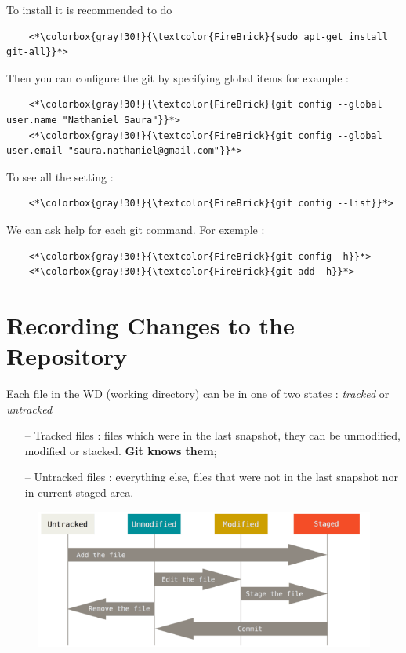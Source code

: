 \documentclass[a4paper,12pt]{article}
\numberwithin{equation}{section} %
\begin{document}
To install it is recommended to do 
\begin{lstlisting}
	<*\colorbox{gray!30!}{\textcolor{FireBrick}{sudo apt-get install git-all}}*> 
\end{lstlisting}
Then you can configure the git by specifying global items for example :
\begin{lstlisting}
	<*\colorbox{gray!30!}{\textcolor{FireBrick}{git config --global user.name "Nathaniel Saura"}}*>
	<*\colorbox{gray!30!}{\textcolor{FireBrick}{git config --global user.email "saura.nathaniel@gmail.com"}}*>
\end{lstlisting}
To see all the setting :
\begin{lstlisting}
	<*\colorbox{gray!30!}{\textcolor{FireBrick}{git config --list}}*>
\end{lstlisting}

We can ask help for each git command. For exemple :
\begin{lstlisting}
	<*\colorbox{gray!30!}{\textcolor{FireBrick}{git config -h}}*>
	<*\colorbox{gray!30!}{\textcolor{FireBrick}{git add -h}}*>
\end{lstlisting}

\pagebreak

\section*{Recording Changes to the Repository}
Each file in the WD (working directory) can be in one of two states : \textit{tracked} or \textit{untracked}

\begin{itemize}
	\item[--] Tracked files : files which were in the last snapshot, they can be unmodified, modified or stacked. \textbf{Git knows them}; \\
	\item[--] Untracked files : everything else, files that were not in the last snapshot nor in current staged area.\\[6mm]
\end{itemize}

\begin{figure}[!ht]
\centering
\includegraphics[scale=0.7]{./pic/file_states.png}
\end{figure}
\end{document}
